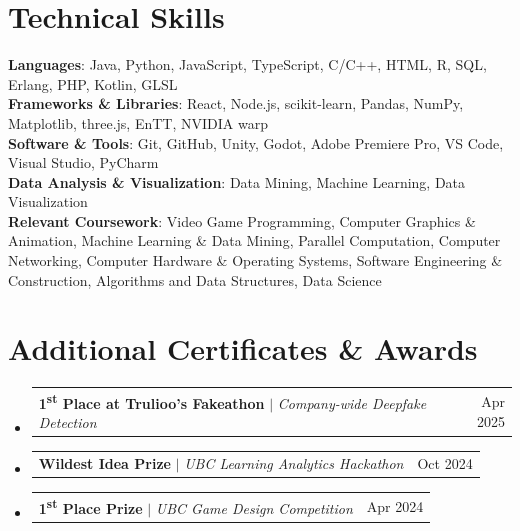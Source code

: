 \documentclass[letterpaper,11pt]{article}
\makeatletter
\newcommand{\resumeProjectHeading}[2]{
    \item
    \begin{tabular*}{0.97\textwidth}{l@{\extracolsep{\fill}}r}
      \small#1 & #2 \\
    \end{tabular*}\vspace{-7pt}
}
\newcommand{\resumeSubHeadingListStart}{\begin{itemize}[leftmargin=0.15in, label={}]}
\newcommand{\resumeSubHeadingListEnd}{\end{itemize}}
\makeatother
\begin{document}
\newcommand{\skills}{
%
\section{Technical Skills}
 \begin{itemize}[leftmargin=0.15in, label={}]
    \small{\item{
     \textbf{Languages}{: Java, Python, JavaScript, TypeScript, C/C++, HTML, R, SQL, Erlang, PHP, Kotlin, GLSL} \\
     \textbf{Frameworks \& Libraries}{: React, Node.js, scikit-learn, Pandas, NumPy, Matplotlib, three.js, EnTT, NVIDIA warp} \\
     \textbf{Software \& Tools}{: Git, GitHub, Unity, Godot, Adobe Premiere Pro, VS Code, Visual Studio, PyCharm} \\
     \textbf{Data Analysis \& Visualization}{: Data Mining, Machine Learning, Data Visualization} \\
     \textbf{Relevant Coursework}{: Video Game Programming, Computer Graphics \& Animation, Machine Learning \& Data Mining, Parallel Computation, Computer Networking, Computer Hardware \& Operating Systems, Software Engineering \& Construction, Algorithms and Data Structures, Data Science}
    }}
 \end{itemize}
}
\newcommand{\awards}{
\section{Additional Certificates \& Awards}
  \resumeSubHeadingListStart
    \resumeProjectHeading
      {\textbf{1\textsuperscript{st} Place at Trulioo’s Fakeathon} $|$ \emph{Company-wide Deepfake Detection}}{Apr 2025}
    \resumeProjectHeading
      {\textbf{Wildest Idea Prize} $|$ \emph{UBC Learning Analytics Hackathon}}{Oct 2024}
    \resumeProjectHeading
      {\textbf{1\textsuperscript{st} Place Prize} $|$ \emph{UBC Game Design Competition}}{Apr 2024}
    \resumeSubHeadingListEnd
}

\education
\experience
\projects
\skills
\awards
\end{document}
